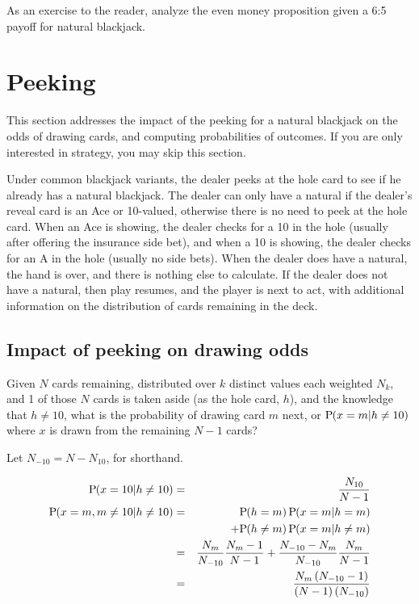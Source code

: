 As an exercise to the reader, analyze the even money proposition
given a 6:5 payoff for natural blackjack.

\section{Peeking}
\label{sec:basic:peeking}

This section addresses the impact of the peeking for a natural blackjack
on the odds of drawing cards, and computing probabilities of outcomes.
If you are only interested in strategy, you may skip this section.  

Under common blackjack variants, the dealer peeks at the hole card
to see if he already has a natural blackjack.
The dealer can only have a natural if the dealer's reveal card is an 
Ace or 10-valued, otherwise there is no need to peek at the hole card.
When an Ace is showing, the dealer checks for a 10 in the hole (usually 
after offering the insurance side bet), and when a 10 is showing, 
the dealer checks for an A in the hole (usually no side bets).
When the dealer does have a natural, the hand is over, 
and there is nothing else to calculate.
If the dealer does not have a natural, then play resumes, 
and the player is next to act, with additional information on the
distribution of cards remaining in the deck.

\subsection{Impact of peeking on drawing odds}
\label{sec:basic:peeking:drawing_odds}
Given $N$ cards remaining, distributed over $k$ distinct values 
each weighted $N_k$, and 1 of those $N$ cards is taken aside 
(as the hole card, $h$), and the knowledge that $h\neq{}10$, 
what is the probability of drawing card $m$ next, 
or $\textrm{P}\hspace{-.5ex}\left(x=m|h\neq{}10\right)$ where $x$ is drawn from the 
remaining $N-1$ cards?

Let $N_{-10}=N-N_{10}$, for shorthand.

\begin{eqnarray}
\textrm{P}\hspace{-.5ex}\left(x=10|h\neq{}10\right) &=& \frac{N_{10}}{N-1}\\
\textrm{P}\hspace{-.5ex}\left(x=m,m\neq{}10|h\neq{}10\right) &=&
  \textrm{P}\hspace{-.5ex}\left(h=m\right) \textrm{P}\hspace{-.5ex}\left(x=m|h=m\right) \nonumber \\
& &  +\textrm{P}\hspace{-.5ex}\left(h\neq{}m\right) \textrm{P}\hspace{-.5ex}\left(x=m|h\neq{}m\right)\\
&=& \frac{N_m}{N_{-10}}\frac{N_m-1}{N-1}
  +\frac{N_{-10}-N_m}{N_{-10}}\frac{N_m}{N-1}\\
&=& \frac{N_m\left(N_{-10}-1\right)}{\left(N-1\right)\left(N_{-10}\right)}
\end{eqnarray}

